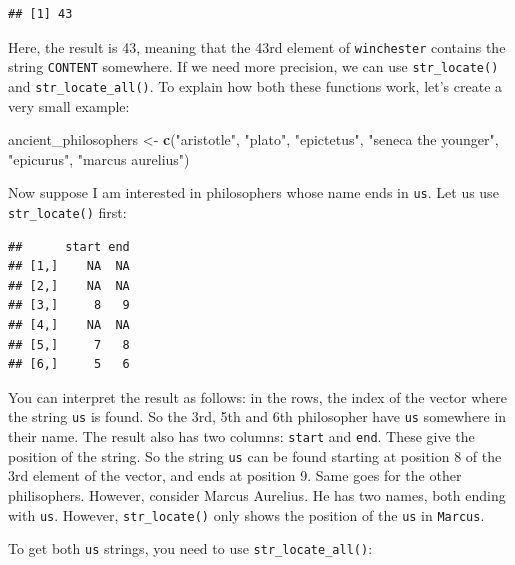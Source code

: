 \documentclass[]{gitbook}
\newenvironment{Shaded}{\begin{snugshade}}{\end{snugshade}}
\newcommand{\KeywordTok}[1]{\textcolor[rgb]{0.13,0.29,0.53}{\textbf{#1}}}
\newcommand{\NormalTok}[1]{#1}
\newcommand{\OperatorTok}[1]{\textcolor[rgb]{0.81,0.36,0.00}{\textbf{#1}}}
\newcommand{\StringTok}[1]{\textcolor[rgb]{0.31,0.60,0.02}{#1}}
\begin{document}
\begin{verbatim}
## [1] 43
\end{verbatim}

Here, the result is 43, meaning that the 43rd element of \texttt{winchester} contains the string \texttt{CONTENT}
somewhere. If we need more precision, we can use \texttt{str\_locate()} and \texttt{str\_locate\_all()}. To explain
how both these functions work, let's create a very small example:

\begin{Shaded}
\begin{Highlighting}[]
\NormalTok{ancient_philosophers <-}\StringTok{ }\KeywordTok{c}\NormalTok{(}\StringTok{"aristotle"}\NormalTok{, }\StringTok{"plato"}\NormalTok{, }\StringTok{"epictetus"}\NormalTok{, }\StringTok{"seneca the younger"}\NormalTok{, }\StringTok{"epicurus"}\NormalTok{, }\StringTok{"marcus aurelius"}\NormalTok{)}
\end{Highlighting}
\end{Shaded}

Now suppose I am interested in philosophers whose name ends in \texttt{us}. Let us use \texttt{str\_locate()} first:

\begin{Shaded}
\end{Shaded}

\begin{verbatim}
##      start end
## [1,]    NA  NA
## [2,]    NA  NA
## [3,]     8   9
## [4,]    NA  NA
## [5,]     7   8
## [6,]     5   6
\end{verbatim}

You can interpret the result as follows: in the rows, the index of the vector where the
string \texttt{us} is found. So the 3rd, 5th and 6th philosopher have \texttt{us} somewhere in their name.
The result also has two columns: \texttt{start} and \texttt{end}. These give the position of the string. So the
string \texttt{us} can be found starting at position 8 of the 3rd element of the vector, and ends at position
9. Same goes for the other philisophers. However, consider Marcus Aurelius. He has two names, both
ending with \texttt{us}. However, \texttt{str\_locate()} only shows the position of the \texttt{us} in \texttt{Marcus}.

To get both \texttt{us} strings, you need to use \texttt{str\_locate\_all()}:
\end{document}
